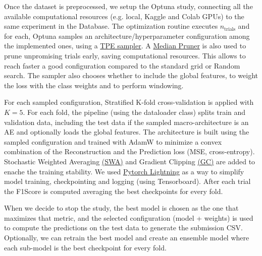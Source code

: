 \noindent Once the dataset is preprocessed, we setup the Optuna study, connecting all the available computational resources (e.g. local, Kaggle and Colab GPUs) to the same experiment in the Database.
The optimization routine executes $n_{\mathrm{trials}}$ and for each, Optuna samples an architecture/hyperparameter configuration among the implemented ones, using a \href{https://optuna.readthedocs.io/en/stable/reference/samplers/generated/optuna.samplers.TPESampler.html}{TPE sampler}. A \href{https://optuna.readthedocs.io/en/stable/reference/generated/optuna.pruners.MedianPruner.html}{Median Pruner} is also used to prune unpromising trials early, saving computational resources.
This allows to reach faster a good configuration compared to the standard grid or Random search.
The sampler also chooses whether to include the global features, to weight the loss with the class weights and to perform windowing.

For each sampled configuration, Stratified K-fold cross-validation is applied with $K=5$. For each fold, the pipeline (using the dataloader class) splits train and validation data, including the test data if the sampled macro-architecture is
an AE and optionally loads the global features.
The architecture is built using the sampled configuration and trained with AdamW to minimize a convex combination of the Reconstruction and the Prediction loss (MSE, cross-entropy). Stochastic Weighted Averaging \href{https://pytorch.org/blog/stochastic-weight-averaging-in-pytorch/}{(SWA)} and Gradient Clipping \href{https://docs.pytorch.org/docs/stable/generated/torch.nn.utils.clip_grad_norm_.html}{(GC)} are added to enache the training stability. We used \href{https://lightning.ai/}{Pytorch Lightning} as a way to simplify model training, checkpointing and logging (using Tensorboard).
After each trial the F1Score is computed averaging the best checkpoints for every fold. 

When we decide to stop the study, the best model is chosen as the one that maximizes that metric, and the selected configuration (model + weights) is used to compute the predictions on the test data to generate the submission CSV.
Optionally, we can retrain the best model and create an ensemble model where each sub-model is the best checkpoint for every fold.

